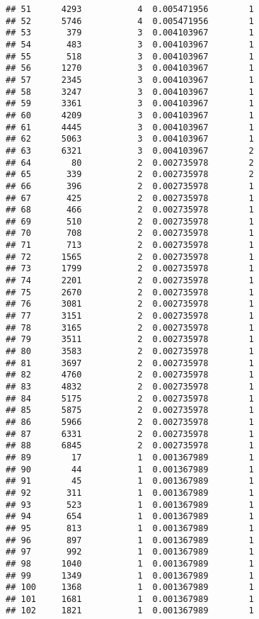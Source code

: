 \documentclass[
]{article}
\begin{document}
\begin{verbatim}
## 51      4293           4  0.005471956        1
## 52      5746           4  0.005471956        1
## 53       379           3  0.004103967        1
## 54       483           3  0.004103967        1
## 55       518           3  0.004103967        1
## 56      1270           3  0.004103967        1
## 57      2345           3  0.004103967        1
## 58      3247           3  0.004103967        1
## 59      3361           3  0.004103967        1
## 60      4209           3  0.004103967        1
## 61      4445           3  0.004103967        1
## 62      5063           3  0.004103967        1
## 63      6321           3  0.004103967        2
## 64        80           2  0.002735978        2
## 65       339           2  0.002735978        2
## 66       396           2  0.002735978        1
## 67       425           2  0.002735978        1
## 68       466           2  0.002735978        1
## 69       510           2  0.002735978        1
## 70       708           2  0.002735978        1
## 71       713           2  0.002735978        1
## 72      1565           2  0.002735978        1
## 73      1799           2  0.002735978        1
## 74      2201           2  0.002735978        1
## 75      2670           2  0.002735978        1
## 76      3081           2  0.002735978        1
## 77      3151           2  0.002735978        1
## 78      3165           2  0.002735978        1
## 79      3511           2  0.002735978        1
## 80      3583           2  0.002735978        1
## 81      3697           2  0.002735978        1
## 82      4760           2  0.002735978        1
## 83      4832           2  0.002735978        1
## 84      5175           2  0.002735978        1
## 85      5875           2  0.002735978        1
## 86      5966           2  0.002735978        1
## 87      6331           2  0.002735978        1
## 88      6845           2  0.002735978        1
## 89        17           1  0.001367989        1
## 90        44           1  0.001367989        1
## 91        45           1  0.001367989        1
## 92       311           1  0.001367989        1
## 93       523           1  0.001367989        1
## 94       654           1  0.001367989        1
## 95       813           1  0.001367989        1
## 96       897           1  0.001367989        1
## 97       992           1  0.001367989        1
## 98      1040           1  0.001367989        1
## 99      1349           1  0.001367989        1
## 100     1368           1  0.001367989        1
## 101     1681           1  0.001367989        1
## 102     1821           1  0.001367989        1

\end{verbatim}
\end{document}
